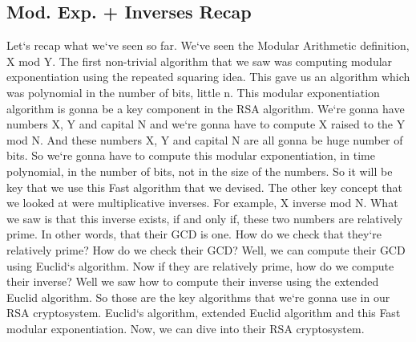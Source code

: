 \subsection{Mod.
Exp. + Inverses Recap}
Let`s recap what we`ve seen so far.
We`ve seen the Modular Arithmetic definition, X mod Y\@.
The first non-trivial algorithm that we saw was computing modular exponentiation using the repeated squaring idea.
This gave us an algorithm which was polynomial in the number of bits, little n.
This modular exponentiation algorithm is gonna be a key component in the RSA algorithm.
We`re gonna have numbers X, Y and capital N and we`re gonna have to compute X raised to the Y mod N\@.
And these numbers X, Y and capital N are all gonna be huge number of bits.
So we`re gonna have to compute this modular exponentiation, in time polynomial, in the number of bits, not in the size of the numbers.
So it will be key that we use this Fast algorithm that we devised.
The other key concept that we looked at were multiplicative inverses.
For example, X inverse mod N\@.
What we saw is that this inverse exists, if and only if, these two numbers are relatively prime.
In other words, that their GCD is one.
How do we check that they`re relatively prime? How do we check their GCD? Well, we can compute their GCD using Euclid`s algorithm.
Now if they are relatively prime, how do we compute their inverse? Well we saw how to compute their inverse using the extended Euclid algorithm.
So those are the key algorithms that we`re gonna use in our RSA cryptosystem.
Euclid`s algorithm, extended Euclid algorithm and this Fast modular exponentiation.
Now, we can dive into their RSA cryptosystem.

